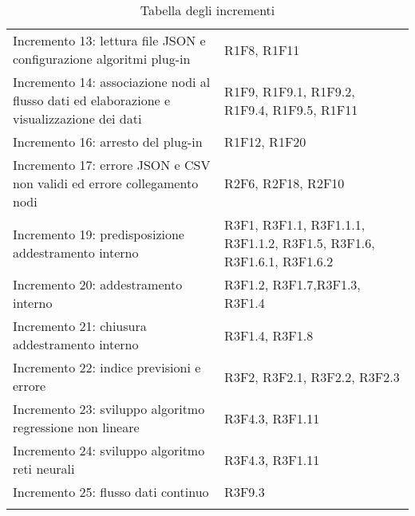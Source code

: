 \begin{longtable} {
		>{\raggedright\arraybackslash}p{85mm}
		>{\raggedleft\arraybackslash}p{40mm}
	}
	Incremento 13: lettura file JSON e configurazione algoritmi plug-in &
	R1F8, R1F11 \TBstrut \\ [2mm]
	
	Incremento 14: associazione nodi al flusso dati ed elaborazione e visualizzazione dei dati &
	R1F9, R1F9.1, R1F9.2, R1F9.4, R1F9.5, R1F11 \TBstrut \\ [2mm]
	
	Incremento 16: arresto del plug-in &
	R1F12, R1F20 \TBstrut \\ [2mm]
	
	Incremento 17: errore JSON e CSV non validi ed errore collegamento nodi &
	R2F6, R2F18, R2F10 \TBstrut \\ [2mm]
	
	Incremento 19: predisposizione addestramento interno &
	R3F1, R3F1.1, R3F1.1.1, R3F1.1.2, R3F1.5, R3F1.6, R3F1.6.1, R3F1.6.2 \TBstrut \\ [2mm]
	
	Incremento 20: addestramento interno &
	R3F1.2, R3F1.7,R3F1.3, R3F1.4 \TBstrut \\ [2mm]
	
	Incremento 21: chiusura addestramento interno &
	R3F1.4, R3F1.8 \TBstrut \\ [2mm]
	
	Incremento 22: indice previsioni e errore &
	R3F2, R3F2.1, R3F2.2, R3F2.3 \TBstrut \\ [2mm]
	
	Incremento 23: sviluppo algoritmo regressione non lineare &
	R3F4.3, R3F1.11 \TBstrut \\ [2mm]
	
	Incremento 24: sviluppo algoritmo reti neurali\glo &
	R3F4.3, R3F1.11 \TBstrut \\ [2mm]
	
	Incremento 25: flusso dati continuo &
	R3F9.3 \TBstrut \\ [2mm]
	\rowcolor{white}
	\caption{Tabella degli incrementi}
\end{longtable}

